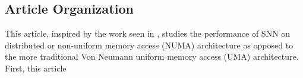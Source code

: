 \documentclass[journal]{IEEEtran}
\begin{document}
\subsection{Article Organization}

This article, inspired by the work seen in \cite{ma2019stochastic}, studies the performance of SNN on distributed or non-uniform memory access (NUMA) architecture as opposed to the more traditional Von Neumann uniform memory access (UMA) architecture. First, this article 

 





%

\end{document}
